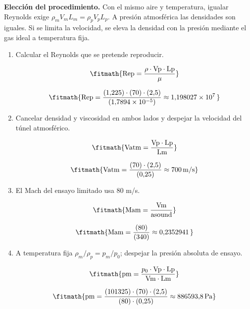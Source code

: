 \noindent\textbf{Elección del procedimiento.} Con el mismo aire y temperatura, igualar Reynolds exige $\rho_mV_mL_m=\rho_pV_pL_p$. A presión atmosférica las densidades son iguales. Si se limita la velocidad, se eleva la densidad con la presión mediante el gas ideal a temperatura fija.

\begin{enumerate}

\item Calcular el Reynolds que se pretende reproducir.

\[\fitmath{\mathrm{Rep}=\frac{\rho\cdot \mathrm{Vp}\cdot \mathrm{Lp}}{\mu}}\]

\[\fitmath{\mathrm{Rep}=\frac{(1{,}225)\cdot (70)\cdot (2{,}5)}{(1{,}7894\times10^{-5})}\approx 1{,}198027\times10^{7}\,}\]

\item Cancelar densidad y viscosidad en ambos lados y despejar la velocidad del túnel atmosférico.

\[\fitmath{\mathrm{Vatm}=\frac{\mathrm{Vp}\cdot \mathrm{Lp}}{\mathrm{Lm}}}\]

\[\fitmath{\mathrm{Vatm}=\frac{(70)\cdot (2{,}5)}{(0{,}25)}\approx 700\,\mathrm{m/s}}\]

\item El Mach del ensayo limitado usa 80 m/s.

\[\fitmath{\mathrm{Mam}=\frac{\mathrm{Vm}}{\mathrm{asound}}}\]

\[\fitmath{\mathrm{Mam}=\frac{(80)}{(340)}\approx 0{,}2352941\,}\]

\item A temperatura fija $\rho_m/\rho_p=p_m/p_0$; despejar la presión absoluta de ensayo.

\[\fitmath{\mathrm{pm}=\frac{p_{0}\cdot \mathrm{Vp}\cdot \mathrm{Lp}}{\mathrm{Vm}\cdot \mathrm{Lm}}}\]

\[\fitmath{\mathrm{pm}=\frac{(101325)\cdot (70)\cdot (2{,}5)}{(80)\cdot (0{,}25)}\approx 886593{,}8\,\mathrm{Pa}}\]

\end{enumerate}
